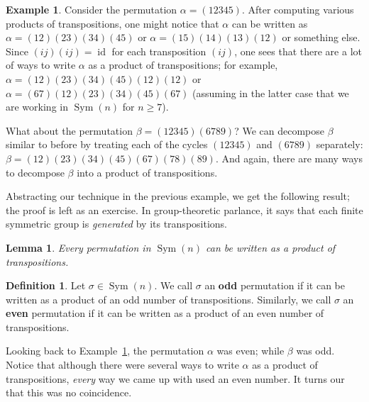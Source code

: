 \documentclass[11pt]{amsart}
\theoremstyle{plain}
\newtheorem*{lemma*}{Lemma}
\theoremstyle{definition}
\newtheorem*{definition*}{Definition}
\newtheorem{example}{Example}
\theoremstyle{remark}
\DeclareMathOperator{\Sym}{Sym}
\DeclareMathOperator{\id}{id}
\begin{document}
\begin{example}\label{exam.DecomposeTranspositions}
Consider the permutation $\alpha = (12345)$. After computing various products of transpositions, one might notice that  $\alpha$ can be written as  $\alpha = (12)(23)(34)(45)$ or $\alpha = (15)(14)(13)(12)$ or something else. Since $(ij)(ij) = \id$ for each transposition $(ij)$, one sees that there are a lot of ways to write $\alpha$ as a product of transpositions; for example, $\alpha = (12)(23)(34)(45)(12)(12)$ or $\alpha = (67)(12)(23)(34)(45)(67)$ (assuming in the latter case that we are working in $\Sym(n)$ for $n\ge 7$). 

What about the permutation $\beta = (12345)(6789)$? We can decompose $\beta$ similar to before by treating each of the cycles $(12345)$ and $(6789)$ separately: $\beta = (12)(23)(34)(45)(67)(78)(89)$. And again, there are many ways to decompose $\beta$ into a product of transpositions. 
\end{example}

Abstracting our technique in the previous example, we get the following result; the proof is left as an exercise. In group-theoretic parlance, it says that each finite symmetric group is \emph{generated} by its transpositions. 

\begin{lemma*}
Every permutation in $\Sym(n)$ can be written as a product of transpositions.
\end{lemma*}

\begin{definition*}
Let $\sigma \in \Sym(n)$. We call $\sigma$ an \textbf{odd} permutation if it can be written as a product of an odd number of transpositions. Similarly, we call $\sigma$  an \textbf{even} permutation if it can be written as a product of an even number of transpositions.
\end{definition*}

Looking back to Example~\ref{exam.DecomposeTranspositions}, the permutation $\alpha$ was even; while $\beta$ was odd. Notice that although there were several ways to write $\alpha$ as a product of transpositions, \emph{every} way we came up with used an even number. It turns our that this was no coincidence.
\end{document}
